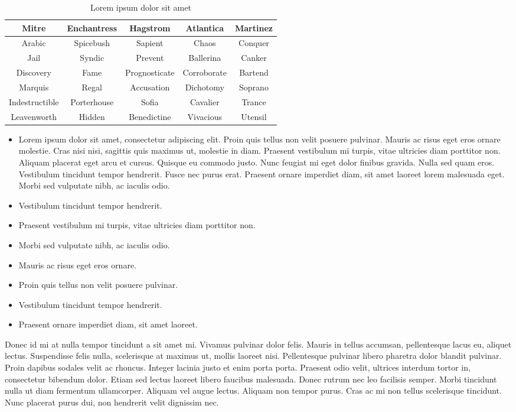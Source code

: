 \begin{sidewaystable}
\centering
\begin{tabular}{|ccccc|}
\hline
\textbf{Mitre} & \textbf{Enchantress} & \textbf{Hagstrom} &
\textbf{Atlantica} & \textbf{Martinez} \\
\hline
Arabic & Spicebush & Sapient & Chaos & Conquer \\
Jail & Syndic & Prevent & Ballerina & Canker \\
Discovery & Fame & Prognosticate & Corroborate & Bartend \\
Marquis & Regal & Accusation & Dichotomy & Soprano \\
Indestructible  & Porterhouse & Sofia & Cavalier & Trance \\
Leavenworth & Hidden & Benedictine & Vivacious & Utensil \\
\hline
\end{tabular}
\caption{Lorem ipsum dolor sit amet}
\end{sidewaystable}

\begin{itemize}
\item Lorem ipsum dolor sit amet, consectetur adipiscing elit. Proin quis tellus non velit posuere pulvinar. Mauris ac risus eget eros ornare molestie. Cras nisi nisi, sagittis quis maximus ut, molestie in diam. Praesent vestibulum mi turpis, vitae ultricies diam porttitor non. Aliquam placerat eget arcu et cursus. Quisque eu commodo justo. Nunc feugiat mi eget dolor finibus gravida. Nulla sed quam eros. Vestibulum tincidunt tempor hendrerit. Fusce nec purus erat. Praesent ornare imperdiet diam, sit amet laoreet lorem malesuada eget. Morbi sed vulputate nibh, ac iaculis odio.
\item Vestibulum tincidunt tempor hendrerit.
\item Praesent vestibulum mi turpis, vitae ultricies diam porttitor non.
\item Morbi sed vulputate nibh, ac iaculis odio.
\item Mauris ac risus eget eros ornare.
\item Proin quis tellus non velit posuere pulvinar.
\item Vestibulum tincidunt tempor hendrerit.
\item Praesent ornare imperdiet diam, sit amet laoreet.
\end{itemize}

Donec id mi at nulla tempor tincidunt a sit amet mi. Vivamus pulvinar dolor felis. Mauris in tellus accumsan, pellentesque lacus eu, aliquet lectus. Suspendisse felis nulla, scelerisque at maximus ut, mollis laoreet nisi. Pellentesque pulvinar libero pharetra dolor blandit pulvinar. Proin dapibus sodales velit ac rhoncus. Integer lacinia justo et enim porta porta. Praesent odio velit, ultrices interdum tortor in, consectetur bibendum dolor. Etiam sed lectus laoreet libero faucibus malesuada. Donec rutrum nec leo facilisis semper. Morbi tincidunt nulla ut diam fermentum ullamcorper. Aliquam vel augue lectus. Aliquam non tempor purus. Cras ac mi non tellus scelerisque tincidunt. Nunc placerat purus dui, non hendrerit velit dignissim nec.

